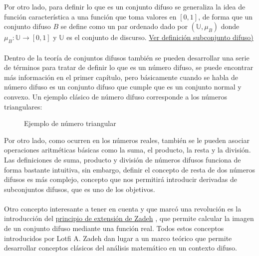Por otro lado, para definir lo que es un conjunto difuso se generaliza la idea de función característica a una función que toma valores en $[0, 1]$, de forma que un conjunto difuso $B$ se define como un par ordenado dado por $(\mathbb{U}, \mu_B)$ donde $\mu_B : \mathbb{U} \longrightarrow [0,1]$ y $\mathbb{U}$ es el conjunto de discurso. \hyperref[def:subconjunto_difuso]{Ver  definición subconjunto difuso)} \\ \\
Dentro de la teoría de conjuntos difusos también se pueden desarrollar una serie de términos para tratar de definir lo que es un número difuso, se puede encontrar más información en el primer capítulo, pero básicamente cuando se habla de número difuso es un conjunto difuso que cumple que es un conjunto normal y convexo. Un ejemplo clásico de número difuso corresponde a los números triangulares:
\begin{figure}[H]
	\centering
	\caption{Ejemplo de número triangular}
\end{figure}
Por otro lado, como ocurren en los números reales, también se le pueden asociar operaciones aritméticas básicas como la suma, el producto, la resta y la división. Las definiciones de suma, producto y división de números difusos funciona de forma bastante intuitiva, sin embargo, definir el concepto de resta de dos números difusos es más complejo, concepto que nos permitirá introducir derivadas de subconjuntos difusos, que es uno de los objetivos.
\\ \\
Otro concepto interesante a tener en cuenta y que marcó una revolución es la introducción del \hyperref[def:zadeh]{principio de extensión de Zadeh} \cite{fuzzyintro}, que permite calcular la imagen de un conjunto difuso mediante una función real. Todos estos conceptos introducidos por Lotfi A. Zadeh dan lugar a un marco teórico que permite desarrollar conceptos clásicos del análisis matemático en un contexto difuso.

